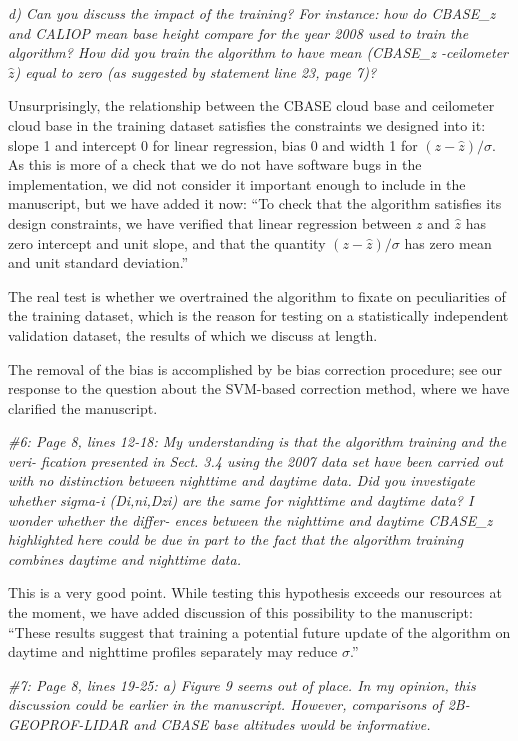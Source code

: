 \documentclass[12pt,a4paper]{responses}
\newcommand{\commentjm}[1]{\todo[inline, color=red!50]{$j_\mu$: #1}}
\begin{document}
\textit{ d) Can you discuss the impact of the training? For instance: how do
  CBASE\_z and CALIOP mean base height compare for the year 2008 used to train
  the algorithm? How did you train the algorithm to have mean (CBASE\_z
  -ceilometer $\hat{z}$) equal to zero (as suggested by statement line 23, page
  7)?}

Unsurprisingly, the relationship between the CBASE cloud base and ceilometer
cloud base in the training dataset satisfies the constraints we designed into
it: slope 1 and intercept 0 for linear regression, bias 0 and width 1 for
$(z - \hat{z})/\sigma$.  As this is more of a check that we do not have software
bugs in the implementation, we did not consider it important enough to include
in the manuscript, but we have added it now: ``To check that the algorithm
satisfies its design constraints, we have verified that linear regression
between $z$ and $\hat{z}$ has zero intercept and unit slope, and that the
quantity $(z - \hat{z})/\sigma$ has zero mean and unit standard deviation.''
\commentjm{actually add that to the manuscript.}  

The real test is whether we overtrained the algorithm to fixate on peculiarities
of the training dataset, which is the reason for testing on a statistically
independent validation dataset, the results of which we discuss at length.

The removal of the bias is accomplished by be bias correction procedure; see our
response to the question about the SVM-based correction method, where we have
clarified the manuscript.

\textit{\#6: Page 8, lines 12-18: My understanding is that the algorithm
  training and the veri- fication presented in Sect.  3.4 using the 2007 data
  set have been carried out with no distinction between nighttime and daytime
  data.  Did you investigate whether sigma-i (Di,ni,Dzi) are the same for
  nighttime and daytime data?  I wonder whether the differ- ences between the
  nighttime and daytime CBASE\_z highlighted here could be due in part to the
  fact that the algorithm training combines daytime and nighttime data.}

This is a very good point.  While testing this hypothesis exceeds our resources
at the moment, we have added discussion of this possibility to the manuscript:
``These results suggest that training a potential future update of the algorithm
on daytime and nighttime profiles separately may reduce $\sigma$.''

\textit{\#7: Page 8, lines 19-25: a) Figure 9 seems out of place. In my opinion, this discussion
could be earlier in the manuscript.   However,  comparisons of 2B-GEOPROF-LIDAR
and CBASE base altitudes would be informative.}
\end{document}
